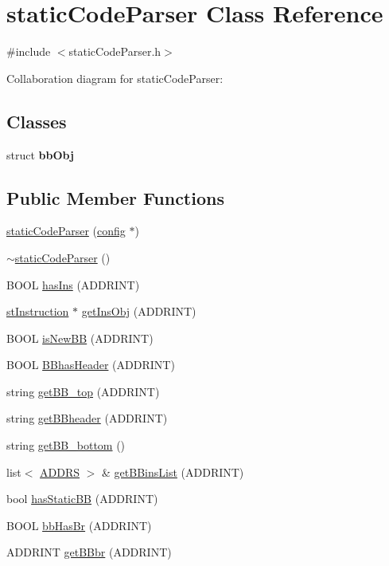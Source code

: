 \hypertarget{classstaticCodeParser}{
\section{staticCodeParser Class Reference}
\label{classstaticCodeParser}
}


{\ttfamily \#include $<$staticCodeParser.h$>$}



Collaboration diagram for staticCodeParser:
\subsection*{Classes}
\begin{DoxyCompactItemize}
\item 
struct {\bfseries bbObj}
\end{DoxyCompactItemize}
\subsection*{Public Member Functions}
\begin{DoxyCompactItemize}
\item 
\hyperlink{classstaticCodeParser_a4658227c3db5eccd31b70d1c9ae70ce7}{staticCodeParser} (\hyperlink{classconfig}{config} $\ast$)
\item 
\hyperlink{classstaticCodeParser_a21c3a8c803545fe616cf63879ed6e6df}{$\sim$staticCodeParser} ()
\item 
BOOL \hyperlink{classstaticCodeParser_a7ba0a025c42ec3ed5ea4067c1da2de09}{hasIns} (ADDRINT)
\item 
\hyperlink{classstInstruction}{stInstruction} $\ast$ \hyperlink{classstaticCodeParser_a88ad5a6c7c2a2853b911ecae21b381cc}{getInsObj} (ADDRINT)
\item 
BOOL \hyperlink{classstaticCodeParser_a4a3dc378e8a2c4cb40217fd8a8bcd06c}{isNewBB} (ADDRINT)
\item 
BOOL \hyperlink{classstaticCodeParser_a0d7e885fd3f9057bac42935d738dfaff}{BBhasHeader} (ADDRINT)
\item 
string \hyperlink{classstaticCodeParser_a04ea5c52890f4896030198b971849dff}{getBB\_\-top} (ADDRINT)
\item 
string \hyperlink{classstaticCodeParser_a5d0490c503b1b8dfd8f99c7776af44fe}{getBBheader} (ADDRINT)
\item 
string \hyperlink{classstaticCodeParser_ace820cefde65b7acbb5364a2318407d8}{getBB\_\-bottom} ()
\item 
list$<$ \hyperlink{binaryTranslator_2frontend_2stInstruction_8h_a7ea74bb9ffd2e4d41550ae2383dd25bc}{ADDRS} $>$ \& \hyperlink{classstaticCodeParser_a1de5cb892555e03810874e3c1c84ac18}{getBBinsList} (ADDRINT)
\item 
bool \hyperlink{classstaticCodeParser_a641d60e35396652d9b92cb4553f90e52}{hasStaticBB} (ADDRINT)
\item 
BOOL \hyperlink{classstaticCodeParser_a8dcb45a15aa2cb663fcac5e367acad03}{bbHasBr} (ADDRINT)
\item 
ADDRINT \hyperlink{classstaticCodeParser_aaa38270129a1d97ec66aa413ea0f3985}{getBBbr} (ADDRINT)
\end{DoxyCompactItemize}


